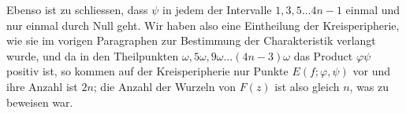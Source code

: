 Ebenso ist zu schliessen, dass $\psi$ in jedem der Intervalle
$1, 3, 5 \dots 4n - 1$ einmal und nur einmal durch Null geht.
Wir haben also eine Eintheilung der Kreisperipherie, wie sie im
vorigen Paragraphen zur Bestimmung der Charakteristik verlangt
wurde, und da in den Theilpunkten $\omega, 5\omega, 9\omega \dots (4n - 3)\omega$
das Product $\varphi\psi$ positiv ist, so kommen auf der Kreisperipherie
nur Punkte $E(f; \varphi, \psi)$ vor und ihre Anzahl ist $2n$; die Anzahl
der Wurzeln von $F(z)$ ist also gleich $n$, was zu beweisen war.
